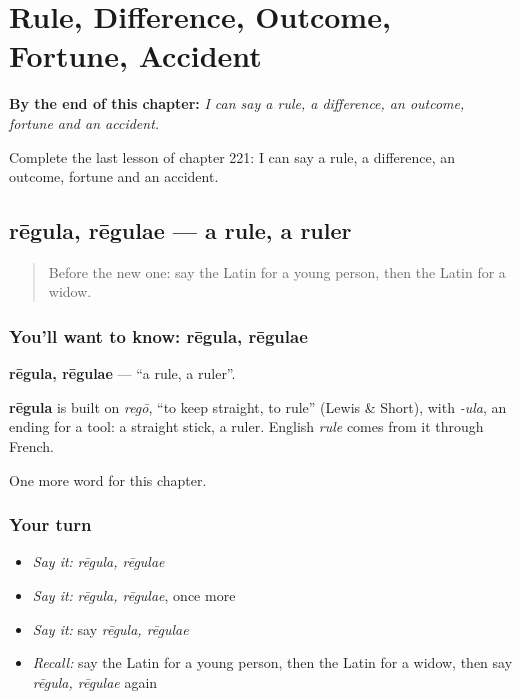 
\chapter{Rule, Difference, Outcome, Fortune, Accident}
\label{ch:la-rule-difference-outcome-fortune-accident}

\begin{chapteropening}
\textbf{By the end of this chapter:} \emph{I can say a rule, a difference, an outcome, fortune and an accident.}

Complete the last lesson of chapter 221: I can say a rule, a difference, an outcome, fortune and an accident.
\end{chapteropening}

\section[rēgula, rēgulae]{rēgula, rēgulae — a rule, a ruler}

\label{lesson:LA-C221-regula}



\begin{quote}
Before the new one: say the Latin for a young person, then the Latin for a widow.
\end{quote}

\subsection*{You'll want to know: rēgula, rēgulae}
\textbf{rēgula, rēgulae} — \textquotedblleft{}a rule, a ruler\textquotedblright{}.

\begin{cousinweb}
\textbf{rēgula} is built on \emph{regō}, \textquotedblleft{}to keep straight, to rule\textquotedblright{} (Lewis \& Short), with \emph{-ula}, an ending for a tool: a straight stick, a ruler. English \emph{rule} comes from it through French.
\end{cousinweb}

\begin{grammarlens}[title={What you've built}]
One more word for this chapter.
\end{grammarlens}

\subsection*{Your turn}
\begin{itemize}
\raggedright
  \item \emph{Say it:} \emph{rēgula, rēgulae}
  \item \emph{Say it:} \emph{rēgula, rēgulae}, once more
  \item \emph{Say it:} say \emph{rēgula, rēgulae}
  \item \emph{Recall:} say the Latin for a young person, then the Latin for a widow, then say \emph{rēgula, rēgulae} again
\end{itemize}

